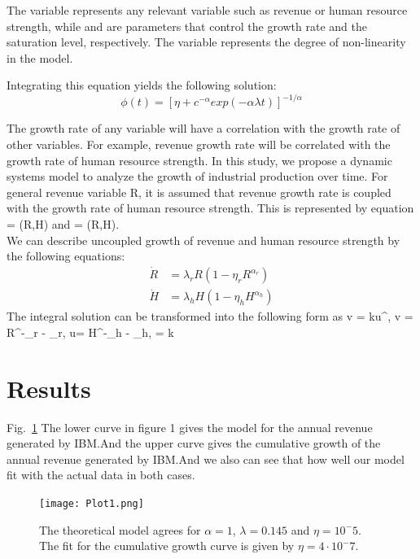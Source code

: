 \documentclass[aps,twocolumn,10pt,reprint]{revtex4}
\newcommand{\be}{\begin{equation}}
\newcommand{\ee}{\end{equation}}
\begin{document}
The variable \phi represents any relevant variable such as revenue or human resource strength, while \lambda and \eta are parameters that control the growth rate and the saturation level, respectively. The variable \alpha represents the degree of non-linearity in the model.

Integrating this equation yields the following solution:
\be\label{Eq:LogisticSol}
\phi(t) = [\eta + c^{- \alpha}exp(-\alpha \lambda t)]^{-1/\alpha}
\ee


The growth rate of any variable will have a correlation with the growth rate of other variables. For example, revenue growth rate will be correlated with the growth rate of human resource strength. In this study, we propose a dynamic systems model to analyze the growth of industrial production over time.
For general revenue variable R, it is assumed that revenue growth rate is coupled with the growth rate of human resource strength. This is represented by equation  = \rho(R,H) and  = \sigma(R,H).
\\

We can describe uncoupled growth of revenue and human resource strength by the following equations: 
\be\label{Eq:Uncoupled}
\begin{split}
\dot{R} &= \lambda_r R (1-\eta_r R^{\alpha_r}) \\
\dot{H} &= \lambda_h H (1-\eta_h H^{\alpha_h})
\end{split}
\ee
The integral solution can be transformed into the following form as v = ku^{\beta}, \quad {} \quad v = R^{-\alpha_r} - \eta_r, \quad u= H^{-\alpha_h} - \eta_h, \quad \beta =   \quad {} \quad k 


\pagebreak

\section{Results}



Fig.~\ref{Fig:image1f} The lower curve in figure 1 gives the model for the annual revenue generated by IBM.And the upper curve gives the cumulative growth of the annual revenue generated by IBM.And we also can see that how well our model fit with the actual data in both cases.
\begin{figure}[!h]
\centering
\texttt{[image: Plot1.png]}~
\caption{The theoretical model agrees for $\alpha=1$,  $\lambda=0.145$ and $\eta=10^-5$. The fit for the cumulative growth curve is given by $\eta=4 \cdot10^-7$.}\label{Fig:image1f}  
\end{figure}
\end{document}
